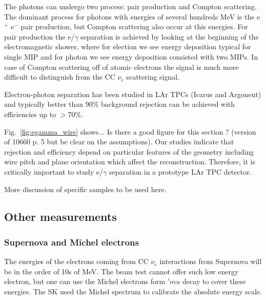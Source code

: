The photons can undergo two process: pair production and Compton scattering. 
The dominant process for photons with energies of several hundreds MeV  is 
the e$^+$ e$^-$ pair production, but Compton scattering also occur at this 
energies. For pair production the e/$\gamma$ separation is achieved by looking 
at the beginning of the electromagnetic shower, where for election we see energy 
deposition typical for single MIP and for photon we see energy deposition consisted 
with two MIPs. In case of Compton scattering off of atomic electrons the 
signal is much more difficult to distinguish from the CC $\nu_e$ scattering signal.

Electron-photon separation has been studied in LAr TPCs
(Icarus and Argoneut) and typically better than 90\% background rejection can be 
achieved with efficiencies up to $>$70\%.

Fig.~\ref{fig:egamma_wire} shows...
Is there a good figure for this section ? (version of 10660 p. 5 but be clear on 
the assumptions). 
Our studies indicate that rejection and efficiency depend 
on particular features of the geometry including wire pitch and plane 
orientation which affect the reconstruction. 
Therefore, it is critically important 
to study e/$\gamma$ separation in a prototype LAr TPC detector.


More discussion of specific samples to be used here.


\subsection{Other measurements} 


\subsubsection{Supernova and Michel electrons}
The energies of the electrons coming from CC $\nu_e$ interactions from Supernova will be in the order of 10s of MeV. 
The beam test cannot offer such low energy electron, but one can use the Michel electrons form $'mu$ decay to cover these energies. The SK used the Michel spectrum to calibrate the absolute energy scale. 




